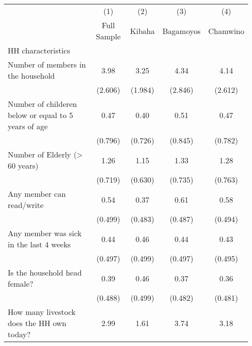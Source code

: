 {
\def\sym#1{\ifmmode^{#1}\else\(^{#1}\)\fi}
\begin{tabular}{l*{4}{c}}
\hline\hline
                    &\multicolumn{1}{c}{(1)}&\multicolumn{1}{c}{(2)}&\multicolumn{1}{c}{(3)}&\multicolumn{1}{c}{(4)}\\
                    &\multicolumn{1}{c}{Full Sample}&\multicolumn{1}{c}{ Kibaha}&\multicolumn{1}{c}{Bagamoyos}&\multicolumn{1}{c}{Chamwino}\\
\hline
HH characteristics  &                     &                     &                     &                     \\
[1em]
Number of members in the household&        3.98         &        3.25         &        4.34         &        4.14         \\
                    &     (2.606)         &     (1.984)         &     (2.846)         &     (2.612)         \\
[1em]
Number of childeren below or equal to 5 years of age&        0.47         &        0.40         &        0.51         &        0.47         \\
                    &     (0.796)         &     (0.726)         &     (0.845)         &     (0.782)         \\
[1em]
Number of Elderly (> 60 years)&        1.26         &        1.15         &        1.33         &        1.28         \\
                    &     (0.719)         &     (0.630)         &     (0.735)         &     (0.763)         \\
[1em]
Any member can read/write&        0.54         &        0.37         &        0.61         &        0.58         \\
                    &     (0.499)         &     (0.483)         &     (0.487)         &     (0.494)         \\
[1em]
Any member was sick in the last 4 weeks&        0.44         &        0.46         &        0.44         &        0.43         \\
                    &     (0.497)         &     (0.499)         &     (0.497)         &     (0.495)         \\
[1em]
Is the household head female?&        0.39         &        0.46         &        0.37         &        0.36         \\
                    &     (0.488)         &     (0.499)         &     (0.482)         &     (0.481)         \\
[1em]
How many livestock does the HH own today?&        2.99         &        1.61         &        3.74         &        3.18         \\

\end{tabular}}

